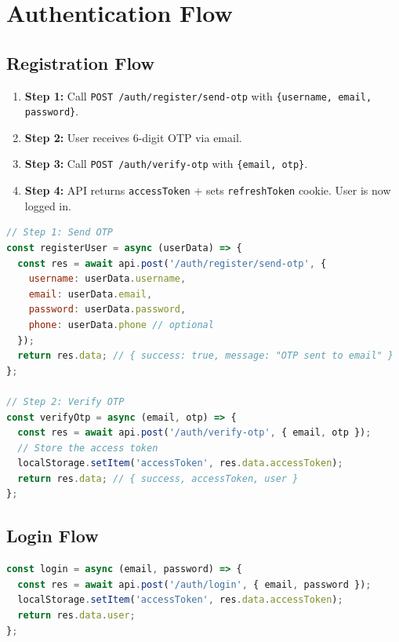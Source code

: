 \section{Authentication Flow}

\subsection{Registration Flow}

\begin{enumerate}
  \item \textbf{Step 1:} Call \texttt{POST /auth/register/send-otp} with \texttt{\{username, email, password\}}.
  \item \textbf{Step 2:} User receives 6-digit OTP via email.
  \item \textbf{Step 3:} Call \texttt{POST /auth/verify-otp} with \texttt{\{email, otp\}}.
  \item \textbf{Step 4:} API returns \texttt{accessToken} + sets \texttt{refreshToken} cookie. User is now logged in.
\end{enumerate}

\begin{lstlisting}[language=JavaScript,title=Registration Implementation]
// Step 1: Send OTP
const registerUser = async (userData) => {
  const res = await api.post('/auth/register/send-otp', {
    username: userData.username,
    email: userData.email,
    password: userData.password,
    phone: userData.phone // optional
  });
  return res.data; // { success: true, message: "OTP sent to email" }
};

// Step 2: Verify OTP
const verifyOtp = async (email, otp) => {
  const res = await api.post('/auth/verify-otp', { email, otp });
  // Store the access token
  localStorage.setItem('accessToken', res.data.accessToken);
  return res.data; // { success, accessToken, user }
};
\end{lstlisting}

\subsection{Login Flow}

\begin{lstlisting}[language=JavaScript,title=Login Implementation]
const login = async (email, password) => {
  const res = await api.post('/auth/login', { email, password });
  localStorage.setItem('accessToken', res.data.accessToken);
  return res.data.user;
};
\end{lstlisting}

